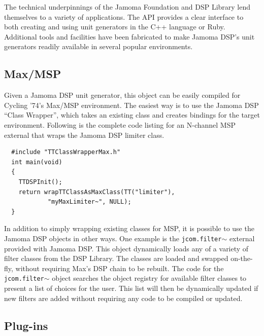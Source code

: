 \documentclass[twoside,10pt]{article}
\begin{document}
The technical underpinnings of the Jamoma Foundation and DSP Library lend themselves to a variety of applications.  The API provides a clear interface to both creating and using unit generators in the C++ language or Ruby.  Additional tools and facilities have been fabricated to make Jamoma DSP's unit generators readily available in several popular environments.


\subsection{Max/MSP}

Given a Jamoma DSP unit generator, this object can be easily compiled for Cycling '74's Max/MSP environment.  The easiest way is to use the Jamoma DSP ``Class Wrapper'', which takes an existing class and creates bindings for the target environment. Following is the complete code listing for an N-channel MSP external that wraps the Jamoma DSP limiter class.

\begin{lstlisting}
  #include "TTClassWrapperMax.h"
  int main(void)
  {
    TTDSPInit();
    return wrapTTClassAsMaxClass(TT("limiter"), 
            "myMaxLimiter~", NULL);
  }
\end{lstlisting}


\noindent In addition to simply wrapping existing classes for MSP, it is possible to use the Jamoma DSP objects in other ways.  One example is the \texttt{jcom.filter$\sim$} external provided with Jamoma DSP.  
This object dynamically loads any of a variety of filter classes from the DSP Library.  The classes are loaded and swapped on-the-fly, without requiring Max's DSP chain to be rebuilt.  The code for the \texttt{jcom.filter$\sim$} object searches the object registry for available filter classes to present a list of choices for the user.  This list will then be dynamically updated if new filters are added without requiring any code to be compiled or updated.   


\subsection{Plug-ins}
\end{document}
